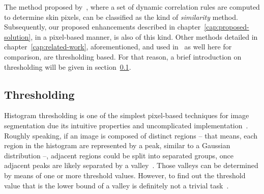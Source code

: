 The method proposed by~\citet{brancati:17}, where a set of dynamic correlation rules are computed to determine skin pixels, can be classified as the kind of \emph{similarity} method. Subsequently, our proposed enhancements described in chapter~\ref{cap:proposed-solution}, in a pixel-based manner, is also of this kind. Other methods detailed in chapter~\ref{cap:related-work}, aforementioned, and used in~\citet{brancati:17} as well here for comparison, are thresholding based. For that reason, a brief introduction on thresholding will be given in section~\ref{sec:thresholding}.


\subsection{Thresholding}
\label{sec:thresholding}
Histogram thresholding is one of the simplest pixel-based techniques for image segmentation due its intuitive properties and uncomplicated implementation~\citep{gonzalez:02}. Roughly speaking, if an image is composed of distinct regions -- that means, each region in the histogram are represented by a peak, similar to a Gaussian distribution --, adjacent regions could be split into separated groups, once adjacent peaks are likely separated by a valley~\citep{konstantinos:00}. Those valleys can be determined by means of one or more threshold values. However, to find out the threshold value that is the lower bound of a valley is definitely not a trivial task~\citep{konstantinos:00}.


